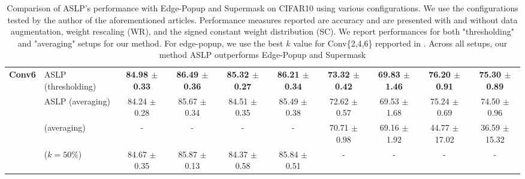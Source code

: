 \begin{table}
{\begin{tabular}{llcccccccc}
       \multirow{4}{*}{\textbf{Conv6}} & ASLP (thresholding) & \textbf{84.98 $\pm$ 0.33} & \textbf{86.49 $\pm$ 0.36} & \textbf{85.32 $\pm$ 0.27} & \textbf{86.21 $\pm$ 0.34} & \textbf{73.32 $\pm$ 0.42} & \textbf{69.83 $\pm$ 1.46} & \textbf{76.20 $\pm$ 0.91} & \textbf{75.30 $\pm$ 0.89} \\
        & ASLP (averaging)& 84.24 $\pm$ 0.28 & 85.67 $\pm$ 0.34 & 84.51 $\pm$ 0.35 & 85.49 $\pm$ 0.38 & 72.62 $\pm$ 0.57 & 69.53 $\pm$ 1.68 & 75.24 $\pm$ 0.69 & 74.50 $\pm$ 0.96 \\
        & \cite{DBLP:conf/nips/ZhouLLY19} (averaging) & - & - & - & - & 70.71 $\pm$ 0.98 & 69.16 $\pm$ 1.92 & 44.77 $\pm$ 17.02 & 36.59 $\pm$ 15.32 \\
        & \cite{DBLP:conf/cvpr/RamanujanWKFR20} ($k=50\%$) & 84.67 $\pm$ 0.35 & 85.87 $\pm$ 0.13 & 84.37 $\pm$ 0.58 & 85.84 $\pm$ 0.51 & - & - & - & - \\
      \bottomrule
    \end{tabular}
  }
  \caption{Comparison of ASLP's performance with Edge-Popup and Supermask
  \cite{DBLP:conf/cvpr/RamanujanWKFR20,DBLP:conf/nips/ZhouLLY19} on CIFAR10
  using various configurations. We use the configurations tested by the author
  of the aforementioned articles. Performance measures reported are accuracy and
  are presented with and without data augmentation, weight rescaling (WR), and
  the signed constant weight distribution (SC). We report performances for both
  "thresholding" and "averaging" setups for our method. For edge-popup, we use
  the best $k$ value for Conv\{2,4,6\} repported in
  \cite{DBLP:conf/cvpr/RamanujanWKFR20}.  Across all setups, our method ASLP
  outperforms Edge-Popup and Supermask}
  \label{tab:chap2:con_performances_comparison_cifar10}
  
\end{table}



